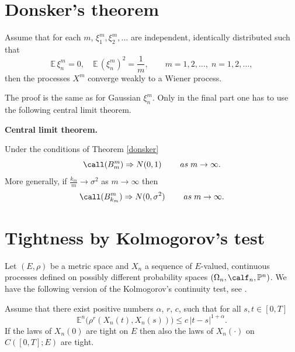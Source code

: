 \documentclass[preprint]{imsart}
\def\P{\mathbb P}
\def\E{\mathbb E}
\begin{document}
{\section{Donsker's theorem}


\begin{Theorem}\label{donsker}
Assume that for each $m$,
 $\xi_1^m, \xi^m_2,\ldots $
are independent, identically distribu\-ted such that
$$
\E\, \xi_n^m=0,\quad \E\, (\xi_n^m)^2 =\frac{1}{m},
\qquad  m=1,2,\ldots,\; n=1,2,\ldots,
$$
then the processes $X^m$ converge weakly to a Wiener
process.
\end{Theorem}

The proof is the same as for Gaussian $\xi_n^m$. Only
in the final part one has to use the following central
limit theorem.



{\bf Central limit theorem.} \begin{em} Under the
conditions of Theorem \ref{donsker}
$$
\call (B^m_m) \Rightarrow N(0,1)
\qquad {\; as \;} m\to\infty.
$$
More generally, if $\frac{k_m}{m}\to \sigma^2$ as
$m\to\infty$ then
$$
\call (B^m_{k_m}) \Rightarrow N(0,\sigma^2)
\qquad {\; as \;} m\to\infty.
$$
\end{em}


\section{Tightness by Kolmogorov's test}

Let $(E,\rho)$ be a metric space and $X_n$ a sequence
of $E$-valued, continuous processes defined on possibly
different probability spaces $(\Omega_n, \calf_n,
\P^n)$. We have the following version of
 the Kolmogorov's continuity test, see \cite{bib13}.

\begin{Theorem}\label{kolmtest}
Assume that there exist positive numbers $\alpha$, $r$,
$c$, such that for all $s,t\in [0,T]$
\begin{equation}\label{kolmogtest1}
\E^n\bigg(
\rho^r(X_n(t),X_n(s))\bigg) \leq c \,
|t-s|^{1+\alpha}.
\end{equation}
If the laws of $X_n(0)$ are tight on $E$ then also the
laws of $X_n(\cdot)$ on $C([0,T];E)$ are tight.
\end{Theorem}

}
\end{document}
